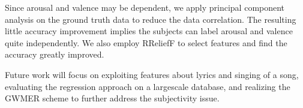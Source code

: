 \documentclass[journal, twoside]{IEEEtran}
\begin{document}
Since arousal and valence may be dependent, we apply principal component analysis on the ground truth data to reduce the data correlation. The resulting little accuracy improvement implies the subjects can label arousal and valence quite independently. We also employ RReliefF to select features and find the accuracy greatly improved.

Future work will focus on exploiting features about lyrics and singing of a song, evaluating the regression approach on a largescale database, and realizing the GWMER scheme to further address the subjectivity issue.




%
%



%
%
\end{document}
